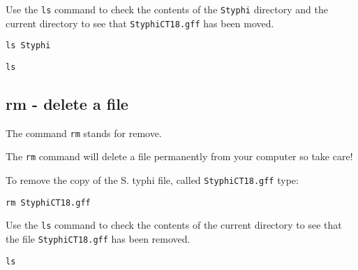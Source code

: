 \documentclass[11pt]{article}
\makeatletter
\newcommand{\boxspacing}{\kern\kvtcb@left@rule\kern\kvtcb@boxsep}
\newcommand{\prompt}[4]{
        {\ttfamily\llap{{\color{blue}\LARGE\faKeyboardO\hspace{3pt}#4}}\vspace{-\baselineskip}}
    }
\makeatother
\begin{document}
    Use the \texttt{ls} command to check the contents of the \texttt{Styphi}
directory and the current directory to see that \texttt{StyphiCT18.gff}
has been moved.

    \begin{tcolorbox}[breakable, size=fbox, boxrule=1pt, pad at break*=1mm,colback=cellbackground, colframe=cellborder]
\prompt{In}{incolor}{ }{\boxspacing}
\begin{Verbatim}[commandchars=\\\{\}]
ls Styphi
\end{Verbatim}
\end{tcolorbox}

    \begin{tcolorbox}[breakable, size=fbox, boxrule=1pt, pad at break*=1mm,colback=cellbackground, colframe=cellborder]
\prompt{In}{incolor}{ }{\boxspacing}
\begin{Verbatim}[commandchars=\\\{\}]
ls
\end{Verbatim}
\end{tcolorbox}

    \hypertarget{rm---delete-a-file}{%
\subsection{rm - delete a file}\label{rm---delete-a-file}}

The command \texttt{rm} stands for remove.

The \texttt{rm} command will delete a file permanently from your
computer so take care!

To remove the copy of the S. typhi file, called \texttt{StyphiCT18.gff}
type:

    \begin{tcolorbox}[breakable, size=fbox, boxrule=1pt, pad at break*=1mm,colback=cellbackground, colframe=cellborder]
\prompt{In}{incolor}{ }{\boxspacing}
\begin{Verbatim}[commandchars=\\\{\}]
rm StyphiCT18.gff
\end{Verbatim}
\end{tcolorbox}

    Use the \texttt{ls} command to check the contents of the current
directory to see that the file \texttt{StyphiCT18.gff} has been removed.

    \begin{tcolorbox}[breakable, size=fbox, boxrule=1pt, pad at break*=1mm,colback=cellbackground, colframe=cellborder]
\prompt{In}{incolor}{ }{\boxspacing}
\begin{Verbatim}[commandchars=\\\{\}]
ls
\end{Verbatim}
\end{tcolorbox}
\end{document}
